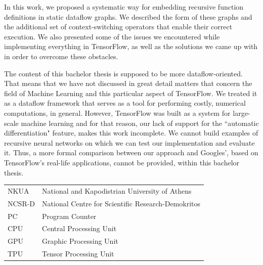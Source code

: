 \documentclass[ack,preface]{dithesis}
\begin{document}
In this work,  we proposed a systematic way for embedding recursive function definitions in static dataflow graphs. We described the form of these graphs and the additional set of context-switching operators that enable their correct execution. We also presented some of the issues we encountered while implementing everything in TensorFlow, as well as the solutions we came up with in order to overcome these obstacles.

The content of this bachelor thesis is supposed to be more dataflow-oriented. That means that we have not discussed in great detail matters that concern the field of  Machine Learning and this particular aspect of TensorFlow. We treated it as a dataflow framework that serves as a tool for performing  costly, numerical computations, in general. However, TensorFlow was  built as a system for large-scale machine learning and for that reason, our lack of support for the ``automatic differentiation" feature, makes this work incomplete. We cannot build examples of recursive neural networks on which we can test our implementation and evaluate it.  Thus, a more formal comparison between our approach and Googles', based on TensorFlow's real-life applications, cannot be provided, within this bachelor thesis.


\backmatter

\abbreviations
\begin{center}
	\renewcommand{\arraystretch}{1.5}
	\begin{longtable}{ l @{\qquad} l }
	\toprule
	NKUA    & National and Kapodistrian University of Athens\\
	NCSR-D & National Centre for Scientific Research-Demokritos \\
	PC & Program Counter \\
	CPU & Central Processing Unit\\
	GPU & Graphic Processing Unit\\
	TPU & Tensor Processing Unit\\
	\bottomrule
	\end{longtable}
\end{center}
\end{document}
